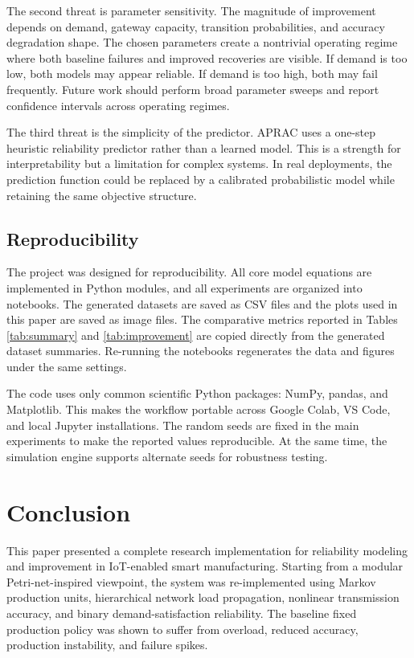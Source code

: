 \documentclass[journal]{IEEEtran}
\begin{document}
The second threat is parameter sensitivity. The magnitude of improvement depends on demand, gateway capacity, transition probabilities, and accuracy degradation shape. The chosen parameters create a nontrivial operating regime where both baseline failures and improved recoveries are visible. If demand is too low, both models may appear reliable. If demand is too high, both may fail frequently. Future work should perform broad parameter sweeps and report confidence intervals across operating regimes.

The third threat is the simplicity of the predictor. APRAC uses a one-step heuristic reliability predictor rather than a learned model. This is a strength for interpretability but a limitation for complex systems. In real deployments, the prediction function could be replaced by a calibrated probabilistic model while retaining the same objective structure.

\subsection{Reproducibility}

The project was designed for reproducibility. All core model equations are implemented in Python modules, and all experiments are organized into notebooks. The generated datasets are saved as CSV files and the plots used in this paper are saved as image files. The comparative metrics reported in Tables \ref{tab:summary} and \ref{tab:improvement} are copied directly from the generated dataset summaries. Re-running the notebooks regenerates the data and figures under the same settings.

The code uses only common scientific Python packages: NumPy, pandas, and Matplotlib. This makes the workflow portable across Google Colab, VS Code, and local Jupyter installations. The random seeds are fixed in the main experiments to make the reported values reproducible. At the same time, the simulation engine supports alternate seeds for robustness testing.

\section{Conclusion}
\label{sec:conclusion}

This paper presented a complete research implementation for reliability modeling and improvement in IoT-enabled smart manufacturing. Starting from a modular Petri-net-inspired viewpoint, the system was re-implemented using Markov production units, hierarchical network load propagation, nonlinear transmission accuracy, and binary demand-satisfaction reliability. The baseline fixed production policy was shown to suffer from overload, reduced accuracy, production instability, and failure spikes.
\end{document}
